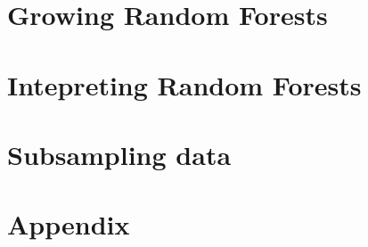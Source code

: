 \documentclass[twoside,openright,titlepage,numbers=noenddot,headinclude,%
               footinclude=true,cleardoublepage=empty,abstractoff,BCOR=5mm,%
               paper=a4,fontsize=11pt,ngerman,american]{scrreprt}
\begin{document}
\frenchspacing
\raggedbottom
{}
\pagestyle{plain}


\cleardoublepage
\cleardoublepage
\cleardoublepage
\pagestyle{scrheadings}
\cleardoublepage



\cleardoublepage
\part{Growing Random Forests}


\cleardoublepage
\part{Intepreting Random Forests}
%

\cleardoublepage
\part{Subsampling data}
%


\appendix
\cleardoublepage
\part{Appendix}

\cleardoublepage
\end{document}
